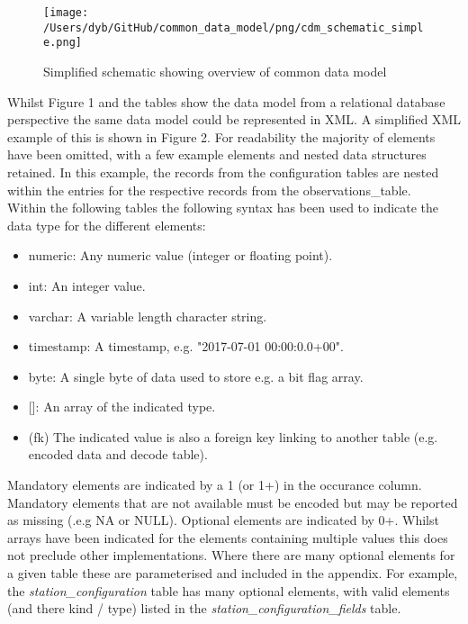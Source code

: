 \documentclass[a4paper]{article}
\begin{document}
\begin{figure}
\centering
\texttt{[image: /Users/dyb/GitHub/common\_data\_model/png/cdm\_schematic\_simple.png]}
\caption {Simplified schematic showing overview of common data model}
\end{figure}

\FloatBarrier

Whilst Figure 1 and the tables show the data model from a relational database perspective the same data model could be represented in XML. A simplified XML example of this is shown in Figure 2. For readability the majority of elements have been omitted, with a few example elements and nested data structures retained. In this example, the records from the configuration tables are nested within the entries for the respective records from the observations\_table.\\

Within the following tables the following syntax has been used to indicate the data type for the different elements: \\
\begin{itemize}
\item numeric: \tabto{3 cm} Any numeric value (integer or floating point).
\item int: \tabto{3 cm} An integer value.
\item varchar: \tabto{3 cm} A variable length character string.
\item timestamp: \tabto{3 cm} A timestamp, e.g. "2017-07-01 00:00:0.0+00".
\item byte: \tabto{3 cm} A single byte of data used to store e.g. a bit flag array. 
\item {[]}:\tabto{3 cm} An array of the indicated type.
\item (fk)  \tabto{3 cm} The indicated value is also a foreign key linking to another table (e.g. encoded data and decode table).
\end {itemize}

Mandatory elements are indicated by a 1 (or 1+) in the occurance column. Mandatory elements that are not available must be encoded but may be reported as missing (.e.g NA or NULL). Optional elements are indicated by 0+. Whilst arrays have been indicated for the elements containing multiple values this does not preclude other implementations. Where there are many optional elements for a given table these are parameterised and included in the appendix. For example, the \textit{station\_configuration} table has many optional elements, with valid elements (and there kind / type) listed in the \textit{station\_configuration\_fields} table.
\end{document}
